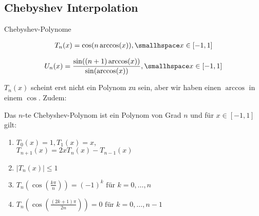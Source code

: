 
\newsection
\subsection{Chebyshev Interpolation}

%
%


\begin{definition}[]{Chebyshev-Polynome}
	\begin{multicols}{2}
		\rmvspace
		\begin{align*}
			T_n(x) = \cos(n \arccos(x)), \smallhspace x \in [-1, 1]
		\end{align*}

		\rmvspace
		\begin{align*}
			U_n(x) = \frac{\sin((n + 1) \arccos(x))}{\sin(\arccos(x))}, \smallhspace x \in [-1, 1]
		\end{align*}
	\end{multicols}
\end{definition}
$T_n(x)$ scheint erst nicht ein Polynom zu sein, aber wir haben einen $\arccos$ in einem $\cos$. Zudem:

Das $n$-te Chebyshev-Polynom ist ein Polynom von Grad $n$ und für $x \in [-1, 1]$ gilt:
\begin{multicols}{2}
	\begin{enumerate}
		\item $T_0(x) = 1, T_1(x) = x$,\\ $T_{n + 1}(x) = 2x T_n(x) - T_{n - 1}(x)$
		\item $|T_n(x)| \leq 1$
		\item $T_n\left(\cos\left( \frac{k\pi}{n} \right)\right) = (-1)^k \text{ für } k = 0, \ldots, n$
		\item $T_n\left( \cos\left( \frac{(2k + 1) \pi}{2n} \right) \right) = 0 \text{ für } k = 0, \ldots, n - 1$
	\end{enumerate}
\end{multicols}

